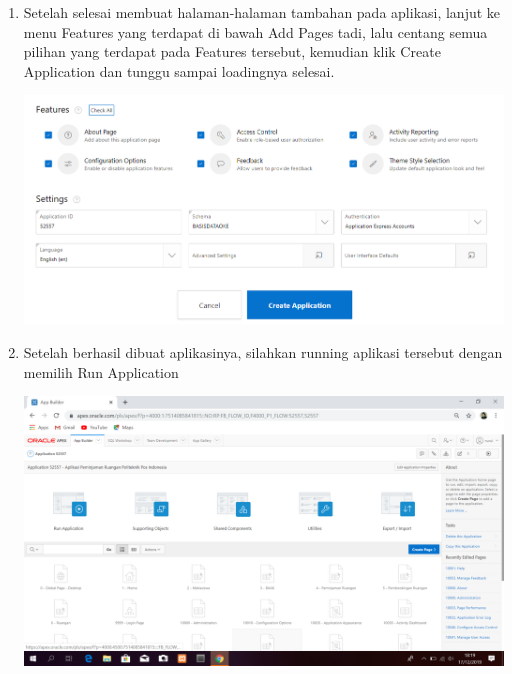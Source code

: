 \documentclass{article}
\begin{document}
\begin{enumerate}
     \item  Setelah selesai membuat halaman-halaman tambahan pada aplikasi, lanjut ke menu Features yang terdapat di bawah Add Pages tadi, lalu centang semua pilihan yang terdapat pada Features tersebut, kemudian klik Create Application dan tunggu sampai loadingnya selesai.
     \begin{center}
     \includegraphics[width=.8\textwidth]{Figure/10.PNG}
     \end{center}
     
     \item Setelah berhasil dibuat aplikasinya, silahkan running aplikasi tersebut dengan memilih Run Application
     \begin{center}
     \includegraphics[width=.8\textwidth]{Figure/11.PNG}
     \end{center}\\
     

\end{enumerate}
\end{document}
